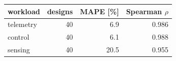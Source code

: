 \scriptsize
\begin{tabular}{lrrr}
\toprule
workload & designs & MAPE [\%] & Spearman $\rho$ \\
\midrule
telemetry & 40 & 6.9 & 0.986 \\
control & 40 & 6.1 & 0.988 \\
sensing & 40 & 20.5 & 0.955 \\
\bottomrule
\end{tabular}
